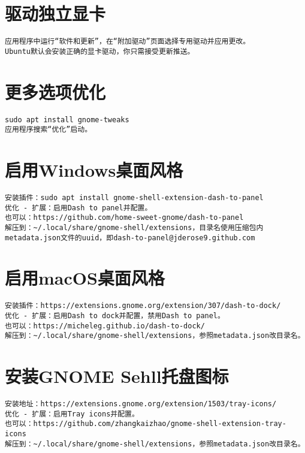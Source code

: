 \documentclass[a4paper,fontset=fandol,zihao=-4,linespread=1.2,oneside]{ctexbook}
\begin{document}
\section{驱动独立显卡}
\begin{lstlisting}
应用程序中运行“软件和更新”，在“附加驱动”页面选择专用驱动并应用更改。
Ubuntu默认会安装正确的显卡驱动，你只需接受更新推送。
\end{lstlisting}

\section{更多选项优化}
\begin{lstlisting}
sudo apt install gnome-tweaks
应用程序搜索“优化”启动。
\end{lstlisting}

\section{启用Windows桌面风格}
\begin{lstlisting}
安装插件：sudo apt install gnome-shell-extension-dash-to-panel
优化 - 扩展：启用Dash to panel并配置。
也可以：https://github.com/home-sweet-gnome/dash-to-panel
解压到：~/.local/share/gnome-shell/extensions，目录名使用压缩包内metadata.json文件的uuid，即dash-to-panel@jderose9.github.com
\end{lstlisting}

\section{启用macOS桌面风格}
\begin{lstlisting}
安装插件：https://extensions.gnome.org/extension/307/dash-to-dock/
优化 - 扩展：启用Dash to dock并配置，禁用Dash to panel。
也可以：https://micheleg.github.io/dash-to-dock/
解压到：~/.local/share/gnome-shell/extensions，参照metadata.json改目录名。
\end{lstlisting}

\section{安装GNOME Sehll托盘图标}
\begin{lstlisting}
安装地址：https://extensions.gnome.org/extension/1503/tray-icons/
优化 - 扩展：启用Tray icons并配置。
也可以：https://github.com/zhangkaizhao/gnome-shell-extension-tray-icons
解压到：~/.local/share/gnome-shell/extensions，参照metadata.json改目录名。
\end{lstlisting}
\end{document}
